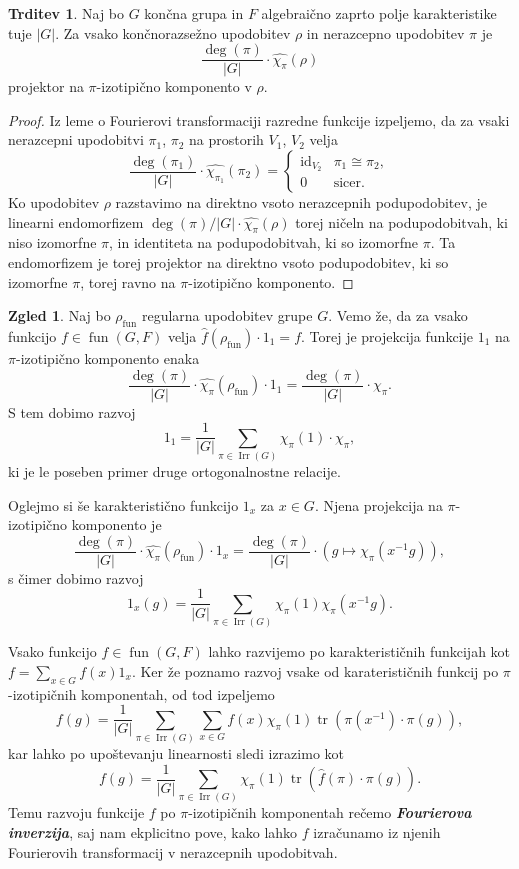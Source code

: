 \documentclass[11pt]{book}
\DeclareMathOperator\tr{tr}
\DeclareMathOperator\Irr{Irr}
\DeclareMathOperator\fun{fun}
\DeclareMathOperator\id{id}
\def\definicija{\color{rdeca}\bf\em}
\theoremstyle{definition}
\theoremstyle{zgled}
\newtheorem*{zgled}{Zgled}
\theoremstyle{odprtproblem}
\theoremstyle{domacanaloga}
\newenvironment{dokaz}
    {\color{siva}\begin{proof}}
    {\end{proof}}
\theoremstyle{izrek}
\newtheorem*{trditev}{Trditev}
\begin{document}
\begin{trditev}
Naj bo $G$ končna grupa in $F$ algebraično zaprto polje karakteristike tuje $|G|$. Za vsako končnorazsežno upodobitev $\rho$ in nerazcepno upodobitev $\pi$ je
\[
    \frac{\deg(\pi)}{|G|} \cdot \widehat{\chi_{\pi}}(\rho)
\]
projektor na $\pi$-izotipično komponento v $\rho$.
\end{trditev}
\begin{dokaz}
Iz leme o Fourierovi transformaciji razredne funkcije izpeljemo, da za vsaki nerazcepni upodobitvi $\pi_1$, $\pi_2$ na prostorih $V_1$, $V_2$ velja
\[
    \frac{\deg(\pi_1)}{|G|} \cdot \widehat{\chi_{\pi_1}}(\pi_2) = \begin{cases}
        {\textstyle \id_{V_2}} & \pi_1 \cong \pi_2, \\
        0 & \text{sicer.}
    \end{cases}
\]
Ko upodobitev $\rho$ razstavimo na direktno vsoto nerazcepnih podupodobitev, je linearni endomorfizem $\deg(\pi)/|G| \cdot \widehat{\chi_{\pi}}(\rho)$ torej ničeln na podupodobitvah, ki niso izomorfne $\pi$, in identiteta na podupodobitvah, ki so izomorfne $\pi$. Ta endomorfizem je torej projektor na direktno vsoto podupodobitev, ki so izomorfne $\pi$, torej ravno na $\pi$-izotipično komponento.
\end{dokaz}

\begin{zgled}
Naj bo $\rho_{\fun}$ regularna upodobitev grupe $G$. Vemo že, da za vsako funkcijo $f \in \fun(G,F)$ velja $\hat{f}(\rho_{\fun}) \cdot 1_1 = f$. Torej je projekcija funkcije $1_1$ na $\pi$-izotipično komponento enaka
\[
    \frac{\deg(\pi)}{|G|} \cdot \widehat{\chi_{\pi}}(\rho_{\fun}) \cdot 1_1 = 
    \frac{\deg(\pi)}{|G|} \cdot \chi_{\pi}.
\]
S tem dobimo razvoj
\[
    1_1 = \frac{1}{|G|} \sum_{\pi \in \Irr(G)} \chi_{\pi}(1) \cdot \chi_{\pi},
\]
ki je le poseben primer druge ortogonalnostne relacije.

Oglejmo si še karakteristično funkcijo $1_x$ za $x \in G$. Njena projekcija na $\pi$-izotipično komponento je
\[
    \frac{\deg(\pi)}{|G|} \cdot \widehat{\chi_{\pi}}(\rho_{\fun}) \cdot 1_x = 
    \frac{\deg(\pi)}{|G|} \cdot \left( g \mapsto \chi_{\pi}(x^{-1}g) \right),
\]
s čimer dobimo razvoj
\[
    1_x(g) = \frac{1}{|G|} \sum_{\pi \in \Irr(G)} \chi_{\pi}(1) \chi_{\pi}(x^{-1} g).
\]
\end{zgled}

Vsako funkcijo $f \in \fun(G,F)$ lahko razvijemo po karakterističnih funkcijah kot $f = \sum_{x \in G} f(x) 1_x$. Ker že poznamo razvoj vsake od karaterističnih funkcij po $\pi$-izotipičnih komponentah, od tod izpeljemo
\[
    f(g) = \frac{1}{|G|} \sum_{\pi \in \Irr(G)} \sum_{x \in G} f(x) \chi_{\pi}(1) \tr \left( \pi(x^{-1}) \cdot \pi(g) \right),
\]
kar lahko po upoštevanju linearnosti sledi izrazimo kot 
\[
    f(g) = \frac{1}{|G|} \sum_{\pi \in \Irr(G)} \chi_{\pi}(1) \tr \left( \hat{f}(\pi) \cdot \pi(g) \right).
\]
Temu razvoju funkcije $f$ po $\pi$-izotipičnih komponentah rečemo {\definicija Fourierova inverzija}, saj nam ekplicitno pove, kako lahko $f$ izračunamo iz njenih Fourierovih transformacij v nerazcepnih upodobitvah.
\end{document}
